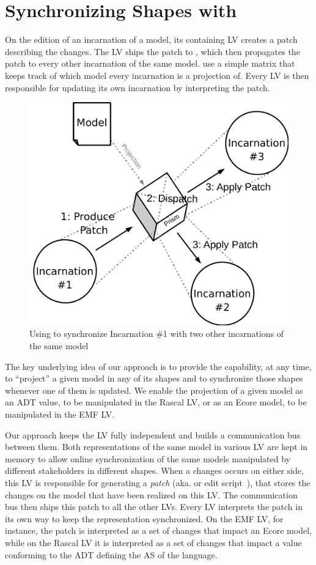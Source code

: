\section{Synchronizing Shapes with \prism}
\label{sec:prism}


On the edition of an incarnation of a model, its containing LV creates a patch describing the changes. The LV ships the patch to \prism, which then propagates the patch to every other incarnation of the same model. \prism use a simple matrix that keeps track of which model every incarnation is a projection of.
Every LV is then responsible for updating its own incarnation by interpreting the patch.

\begin{figure}[bt]
	\centering
	\includegraphics[width=.6\columnwidth]{figures/prism}
	\caption{Using \prism to synchronize Incarnation \#1 with two other incarnations of the same model}
	\label{fig:prism}
\end{figure}

The key underlying idea of our approach is to provide the capability, at any time, to ``project'' a given model in any of its shapes and to synchronize those shapes whenever one of them is updated.
We enable the projection of a given model as an ADT value, to be manipulated in the Rascal LV, or as an Ecore model, to be manipulated in the EMF LV.

Our approach keeps the LV fully independent and builds a communication bus between them.
Both representations of the same model in various LV are kept in memory to allow online synchronization of the same models manipulated by different stakeholders in different shapes.
When a changes occurs on either side, this LV is responsible for generating a \emph{patch} (aka. \de or edit script~\cite{rozen2017towards}), that stores the changes on the model that have been realized on this LV.
The communication bus then ships this patch to all the other LVs.
Every LV interprets the patch in its own way to keep the representation synchronized.
On the EMF LV, for instance, the patch is interpreted as a set of changes that impact an Ecore model, while on the Rascal LV it is interpreted as a set of changes that impact a value conforming to the ADT defining the AS of the language.

